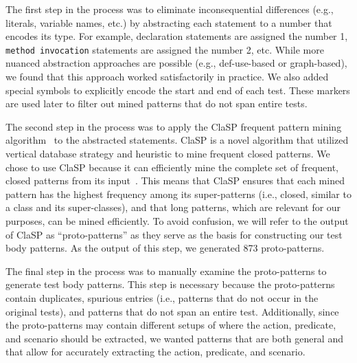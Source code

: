The first step in the process was to eliminate inconsequential differences (e.g., literals, variable names, etc.) by abstracting each statement to a number that encodes its type.
%
For example, declaration statements are assigned the number \num{1}, \texttt{method invocation} statements are assigned the number \num{2}, etc.
%
While more nuanced abstraction approaches are possible (e.g., def-use-based or graph-based), we found that this approach worked satisfactorily in practice.
%
We also added special symbols to explicitly encode the start and end of each test.
%
These markers are used later to filter out mined patterns that do not span entire tests.


The second step in the process was to apply the ClaSP frequent pattern mining algorithm~\cite{gomariz2013clasp} to the abstracted statements.
ClaSP is a novel algorithm that utilized vertical database strategy and heuristic to mine frequent closed patterns.
%
We chose to use ClaSP because it can efficiently mine the complete set of frequent, closed patterns from its input~\cite{fournier2017survey}.
%
This means that ClaSP ensures that each mined pattern has the highest frequency among its super-patterns (i.e., closed, similar to a class and its super-classes), and that long patterns, which are relevant for our purposes, can be mined efficiently.
%
To avoid confusion, we will refer to the output of ClaSP as \enquote{proto-patterns} as they serve as the basis for constructing our test body patterns.
%
As the output of this step, we generated \num{873} proto-patterns.


The final step in the process was to manually examine the proto-patterns to generate test body patterns.
%
This step is necessary because the proto-patterns contain duplicates, spurious entries (i.e., patterns that do not occur in the original tests), and patterns that do not span an entire test.
%
Additionally, since the proto-patterns may contain different setups of where the action, predicate, and scenario should be extracted, we wanted patterns that are both general and that allow for accurately extracting the action, predicate, and scenario.



